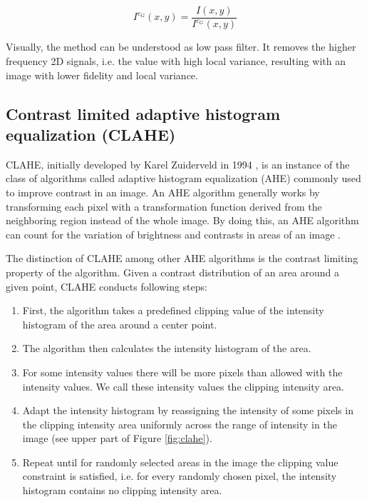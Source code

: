 \documentclass[pdftex,12pt,a4paper]{report}
\begin{document}
\begin{equation}
I^{c_G}(x, y) = \frac{I(x, y)}{I^{c_G}(x, y)} 
\label{equation:gauss_blur_correction}
\end{equation}

Visually, the method can be understood as low pass filter. It removes the higher frequency 2D signals, i.e. the value with high local variance, resulting with an image with lower fidelity and local variance.

\subsection{Contrast limited adaptive histogram equalization (CLAHE)}
\label{subsection:clahe}

CLAHE, initially developed by Karel Zuiderveld in 1994 \cite{zuiderveld1994contrast}, is an instance of the class of algorithms called adaptive histogram equalization (AHE) commonly used to improve contrast in an image. An AHE algorithm generally works by transforming each pixel with a transformation function derived from the neighboring region instead of the whole image.  By doing this, an AHE algorithm can count for the variation of brightness and contrasts in areas of an image \cite{pizer1987adaptive}.

The distinction of CLAHE among other AHE algorithms is the contrast limiting property of the algorithm. Given a contrast distribution of an area around a given point, CLAHE conducts following steps:

\begin{enumerate}
\item First, the algorithm takes a predefined clipping value of the intensity histogram of the area around a center point.
\item The algorithm then calculates the intensity histogram of the area.
\item For some intensity values there will be more pixels than allowed with the intensity values. We call these intensity values the clipping intensity area.
\item Adapt the intensity histogram by reassigning the intensity of some pixels in the clipping intensity area uniformly across the range of intensity in the image (see upper part of Figure \ref{fig:clahe}).
\item Repeat until for randomly selected areas in the image the clipping value constraint is satisfied, i.e. for every randomly chosen pixel, the intensity histogram contains no clipping intensity area.
\end{enumerate}
\end{document}
